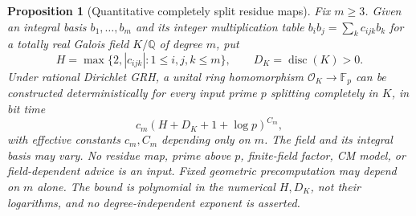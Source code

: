 \documentclass[11pt]{article}
\newtheorem{proposition}[theorem]{Proposition}
\theoremstyle{definition}
\theoremstyle{remark}
\begin{document}
\begin{proposition}[Quantitative completely split residue maps]
\label{prop:quantitative-real-residue}
Fix $m\geq3$.  Given an integral basis $b_1,\ldots,b_m$ and its integer
multiplication table $b_ib_j=\sum_kc_{ijk}b_k$ for a totally real Galois
field $K/\mathbb Q$ of degree $m$, put
\[
 H=\max\{2,|c_{ijk}|:1\leq i,j,k\leq m\},\qquad D_K=\operatorname{disc}(K)>0.
\]
Under rational Dirichlet GRH, a unital ring homomorphism
$\mathcal O_K\longrightarrow\mathbb F_p$ can be constructed deterministically
for every input prime $p$ splitting completely in $K$, in bit time
\[
 c_m(H+D_K+1+\log p)^{C_m},
\]
with effective constants $c_m,C_m$ depending only on $m$.
The field and its integral basis may vary.  No residue map, prime above $p$,
finite-field factor, CM model, or field-dependent advice is an input.
Fixed geometric precomputation may depend on $m$ alone.
The bound is polynomial in the numerical $H,D_K$, not their logarithms,
and no degree-independent exponent is asserted.
\end{proposition}
\end{document}
